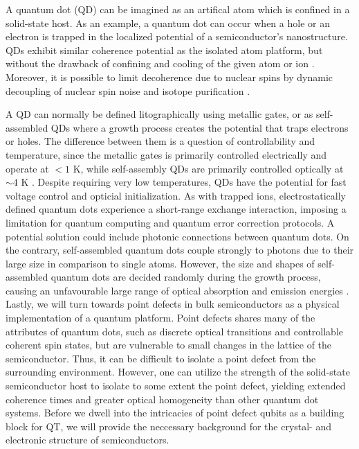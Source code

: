 A quantum dot (QD) can be imagined as an artifical atom which is confined in a solid-state host. As an example, a quantum dot can occur when a hole or an electron is trapped in the localized potential of a semiconductor's nanostructure. QDs exhibit similar coherence potential as the isolated atom platform, but without the drawback of confining and cooling of the given atom or ion \cite{Acin2018}. Moreover, it is possible to limit decoherence due to nuclear spins by dynamic decoupling of nuclear spin noise and isotope purification \cite{Ladd2010}.

A QD can normally be defined litographically using metallic gates, or as self-assembled QDs where a growth process creates the potential that traps electrons or holes. The difference between them is a question of controllability and temperature, since the metallic gates is primarily controlled electrically and operate at $<1$ K, while self-assembly QDs are primarily controlled optically at $\sim 4$ K \cite{Ladd2010}. Despite requiring very low temperatures, QDs have the potential for fast voltage control and opticial initialization. As with trapped ions, electrostatically defined quantum dots experience a short-range exchange interaction, imposing a limitation for quantum computing and quantum error correction protocols. A potential solution could include photonic connections between quantum dots. On the contrary, self-assembled quantum dots couple strongly to photons due to their large size in comparison to single atoms. However, the size and shapes of self-assembled quantum dots are decided randomly during the growth process, causing an unfavourable large range of optical absorption and emission energies \cite{Ladd2010}. \\




Lastly, we will turn towards point defects in bulk semiconductors as a physical implementation of a quantum platform. Point defects shares many of the attributes of quantum dots, such as discrete optical transitions and controllable coherent spin states, but are vulnerable to small changes in the lattice of the semiconductor. Thus, it can be difficult to isolate a point defect from the surrounding environment. However, one can utilize the strength of the solid-state semiconductor host to isolate to some extent the point defect, yielding extended coherence times and greater optical homogeneity than other quantum dot systems. Before we dwell into the intricacies of point defect qubits as a building block for QT, we will provide the neccessary background for the crystal- and electronic structure of semiconductors.   %

